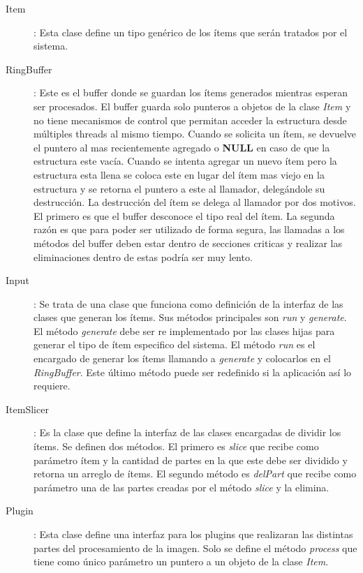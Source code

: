 \begin{description}

\item[Item]: Esta clase define un tipo genérico de los ítems que serán tratados
	por el sistema.

\item[RingBuffer]: Este es el buffer donde se guardan los ítems generados
	mientras esperan ser procesados. El buffer guarda solo punteros a
	objetos de la clase \emph{Item} y no tiene mecanismos de control que
	permitan acceder la estructura desde múltiples threads al mismo tiempo.
	Cuando se solicita un ítem, se devuelve el puntero al mas recientemente
	agregado o \textbf{NULL} en caso de que la estructura este vacía. Cuando
	se intenta agregar un nuevo ítem pero la estructura esta llena se coloca
	este en lugar del ítem mas viejo en la estructura y se retorna el
	puntero a este al llamador, delegándole su destrucción. La destrucción
	del ítem se delega al llamador por dos motivos. El primero es que el
	buffer desconoce el tipo real del ítem. La segunda razón es que para
	poder ser utilizado de forma segura, las llamadas a los métodos del
	buffer deben estar dentro de secciones criticas y realizar las
	eliminaciones dentro de estas podría ser muy lento.

\item[Input]: Se trata de una clase que funciona como definición de la interfaz
	de las clases que generan los ítems. Sus métodos principales son
	\emph{run} y \emph{generate}. El método \emph{generate} debe ser re
	implementado por las clases hijas para generar el tipo de ítem
	especifico del sistema. El método \emph{run} es el encargado de generar
	los ítems llamando a \emph{generate} y colocarlos en el
	\emph{RingBuffer}. Este último método puede ser redefinido si la
	aplicación así lo requiere.

\item[ItemSlicer]: Es la clase que define la interfaz de las clases encargadas
	de dividir los ítems. Se definen dos métodos. El primero es \emph{slice}
	que recibe como parámetro ítem y la cantidad de partes en la que este
	debe ser dividido y retorna un arreglo de ítems. El segundo método es
	\emph{delPart} que recibe como parámetro una de las partes creadas por
	el método \emph{slice} y la elimina.

\item[Plugin]: Esta clase define una interfaz para los plugins que realizaran
	las distintas partes del procesamiento de la imagen. Solo se define el
	método \emph{process} que tiene como único parámetro un puntero a un
	objeto de la clase \emph{Item}.


\end{description}
